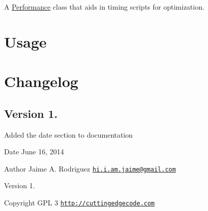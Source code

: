 A \hyperlink{class_performance}{Performance} class that aids in timing scripts for optimization.\hypertarget{nav1_usage}{}\section{Usage}\label{nav1_usage}

\hypertarget{nav1_changelog}{}\section{Changelog}\label{nav1_changelog}
\subsection*{Version 1.}


\begin{DoxyItemize}
\item Added the date section to documentation
\end{DoxyItemize}

\begin{DoxyDate}{Date}
June 16, 2014 
\end{DoxyDate}
\begin{DoxyAuthor}{Author}
Jaime A. Rodriguez \href{mailto:hi.i.am.jaime@gmail.com}{\tt hi.\-i.\-am.\-jaime@gmail.\-com} 
\end{DoxyAuthor}
\begin{DoxyVersion}{Version}
1. 
\end{DoxyVersion}
\begin{DoxyCopyright}{Copyright}
G\-P\-L 3 \href{http://cuttingedgecode.com}{\tt http\-://cuttingedgecode.\-com} 
\end{DoxyCopyright}
